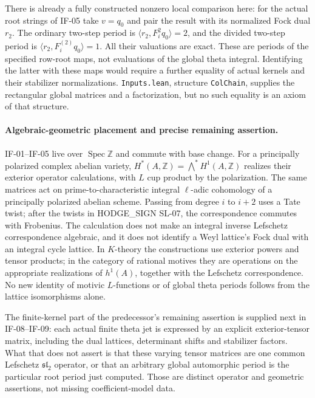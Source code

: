 There is already a fully constructed nonzero local comparison here:
for the actual root strings of IF-05 take $v=q_0$ and pair the result
with its normalized Fock dual $r_2$. The ordinary two-step period is
$\langle r_2,F_i^2q_0\rangle=2$, and the divided two-step period is
$\langle r_2,F_i^{(2)}q_0\rangle=1$. All their valuations are exact.
These are periods of the specified row-root maps, not evaluations of
the global theta integral. Identifying the latter with these maps
would require a further equality of actual kernels and their
stabilizer normalizations. \texttt{Inputs.lean}, structure
\texttt{ColChain}, supplies the rectangular global matrices and a
factorization, but no such equality is an axiom of that structure.

\paragraph{Algebraic-geometric placement and precise remaining assertion.}
IF-01--IF-05 live over $\operatorname{Spec}\mathbb Z$ and commute with
base change. For a principally polarized complex abelian variety,
$H^*(A,\mathbb Z)=\bigwedge^*H^1(A,\mathbb Z)$ realizes their exterior
operator calculations, with $L$ cup product by the polarization.
The same matrices act on prime-to-characteristic integral
$\ell$-adic cohomology of a principally polarized abelian scheme.
Passing from degree $i$ to $i+2$ uses a Tate twist; after the twists in
HODGE\_SIGN SL-07, the correspondence commutes with Frobenius. The
calculation does not make an integral inverse Lefschetz correspondence
algebraic, and it does not identify a Weyl lattice's Fock dual with an
integral cycle lattice. In $K$-theory the constructions use exterior
powers and tensor products; in the category of rational motives they
are operations on the appropriate realizations of $h^1(A)$, together
with the Lefschetz correspondence. No new identity of motivic
$L$-functions or of global theta periods follows from the lattice
isomorphisms alone.

The finite-kernel part of the predecessor's remaining assertion is
supplied next in IF-08--IF-09: each actual finite theta jet is expressed
by an explicit exterior-tensor matrix, including the dual lattices,
determinant shifts and stabilizer factors. What that does not assert
is that these varying tensor matrices are one common Lefschetz
$\mathfrak{sl}_2$ operator, or that an arbitrary global automorphic
period is the particular root period just computed. Those are distinct
operator and geometric assertions, not missing coefficient-model data.








